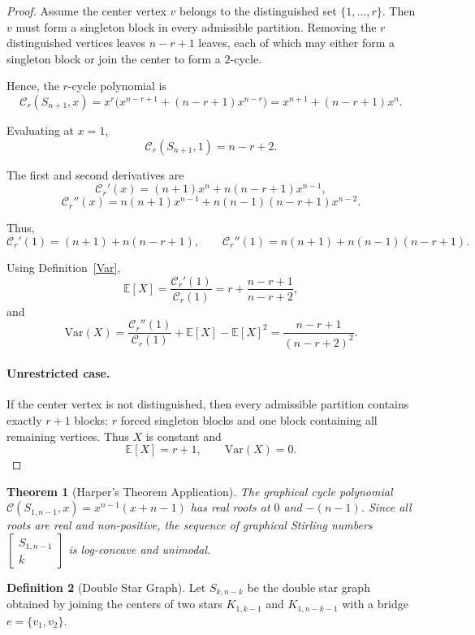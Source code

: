\documentclass{amsart}
\newtheorem{theorem}{Theorem}[section]
\theoremstyle{definition}
\newtheorem{definition}[theorem]{Definition}
\def\st#1#2{\begin{bmatrix} #1 \\ #2 \end{bmatrix}}
\begin{document}
\begin{proof}
Assume the center vertex $v$ belongs to the distinguished set
$\{1,\dots,r\}$.
Then $v$ must form a singleton block in every admissible partition.
Removing the $r$ distinguished vertices leaves $n-r+1$ leaves, each of which
may either form a singleton block or join the center to form a $2$-cycle.

Hence, the $r$-cycle polynomial is
\[
\mathcal{C}_r(S_{n+1},x)
=
x^r\bigl(x^{n-r+1}+(n-r+1)x^{n-r}\bigr)
=
x^{n+1}+(n-r+1)x^n.
\]

Evaluating at $x=1$,
\[
\mathcal{C}_r(S_{n+1},1)=n-r+2.
\]

The first and second derivatives are
\[
\mathcal{C}_r'(x)=(n+1)x^n+n(n-r+1)x^{n-1},
\]
\[
\mathcal{C}_r''(x)=n(n+1)x^{n-1}+n(n-1)(n-r+1)x^{n-2}.
\]

Thus,
\[
\mathcal{C}_r'(1)=(n+1)+n(n-r+1), \qquad
\mathcal{C}_r''(1)=n(n+1)+n(n-1)(n-r+1).
\]

Using Definition~\ref{Var},
\[
\mathbb{E}[X]
=
\frac{\mathcal{C}_r'(1)}{\mathcal{C}_r(1)}
=
r+\frac{n-r+1}{n-r+2},
\]
and
\[
\mathrm{Var}(X)
=
\frac{\mathcal{C}_r''(1)}{\mathcal{C}_r(1)}
+
\mathbb{E}[X]
-
\mathbb{E}[X]^2
=
\frac{n-r+1}{(n-r+2)^2}.
\]

\paragraph{Unrestricted case.}
If the center vertex is not distinguished, then every admissible partition
contains exactly $r+1$ blocks: $r$ forced singleton blocks and one block
containing all remaining vertices.
Thus $X$ is constant and
\[
\mathbb{E}[X]=r+1, \qquad \mathrm{Var}(X)=0.
\]
\end{proof}

\begin{theorem}[Harper's Theorem Application]
The graphical cycle polynomial $\mathcal{C}(S_{1,n-1}, x) = x^{n-1}(x + n - 1)$ has real roots at $0$ and $-(n-1)$. Since all roots are real and non-positive, the sequence of graphical Stirling numbers $\st{S_{1,n-1}}{k}$ is log-concave and unimodal.
\end{theorem}


\begin{definition}[Double Star Graph]
Let $S_{k,n-k}$ be the double star graph obtained by joining the centers of
two stars $K_{1,k-1}$ and $K_{1,n-k-1}$ with a bridge $e = \{v_1,v_2\}$.
\end{definition}
\end{document}
